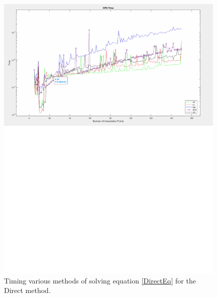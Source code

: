 \documentclass[11pt]{article}%
\begin{document}
\begin{figure}[h]
\centering

\includegraphics[width=11cm]{cpuTimes}%
\vspace{-200pt} %
\caption{Timing various methods of solving equation \eqref{DirectEq} for the Direct method.}
\end{figure}


\clearpage
\newpage
%
\end{document}
